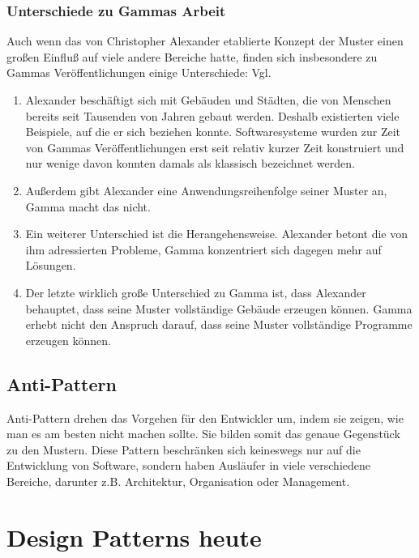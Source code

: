 \documentclass[fontsize=11pt,a4paper,final]{scrreprt}[2003/01/01]
\begin{document}
\subsection{Unterschiede zu Gammas Arbeit}
Auch wenn das von Christopher Alexander etablierte Konzept der Muster einen großen Einfluß auf viele andere Bereiche hatte, finden sich insbesondere zu Gammas Veröffentlichungen einige Unterschiede: Vgl. \cite[S. 438 - 439]{gamma2004}

\begin{enumerate} 
\item Alexander beschäftigt sich mit Gebäuden und Städten, die von Menschen bereits seit Tausenden von Jahren gebaut werden. Deshalb existierten viele Beispiele, auf die er sich beziehen konnte. Softwaresysteme wurden zur Zeit von Gammas Veröffentlichungen erst seit relativ kurzer Zeit konstruiert und nur wenige davon konnten damals als klassisch bezeichnet werden.
\item Außerdem gibt Alexander eine Anwendungsreihenfolge seiner Muster an, Gamma macht das nicht.
\item Ein weiterer Unterschied ist die Herangehensweise. Alexander betont die von ihm adressierten Probleme, Gamma konzentriert sich dagegen mehr auf Lösungen.
\item Der letzte wirklich große Unterschied zu Gamma ist, dass Alexander behauptet, dass seine Muster vollständige Gebäude erzeugen können. Gamma erhebt nicht den Anspruch darauf, dass seine Muster vollständige Programme erzeugen können.
\end{enumerate}

\section{Anti-Pattern}
Anti-Pattern drehen das Vorgehen für den Entwickler um, indem sie zeigen, wie man es am besten nicht machen sollte. Sie bilden somit das genaue Gegenstück zu den Mustern. Diese Pattern beschränken sich keineswegs nur auf die Entwicklung von Software, sondern haben Ausläufer in viele verschiedene Bereiche, darunter z.B. Architektur, Organisation oder Management. \cite{AntiPatternsCatalog}

\chapter{Design Patterns heute}\label{se:Design Patterns heute}


\newpage

\end{document}
